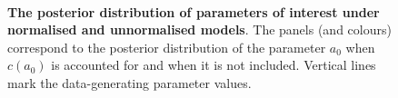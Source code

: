 \documentclass[a4paper, notitlepage, 11pt]{article}
\begin{document}
\begin{figure}
\hfill
{}
\hfill
{}\\
\hfill
{}
\hfill
{}
\hfill
\caption{\textbf{The posterior distribution of parameters of interest under normalised and unnormalised models}.
The panels (and colours) correspond to the posterior distribution of the parameter $a_0$ when $c(a_0)$ is accounted for and when it is not included.
Vertical lines mark the data-generating parameter values.
}
\label{fig:parameter_estimates}
\end{figure}
\end{document}
